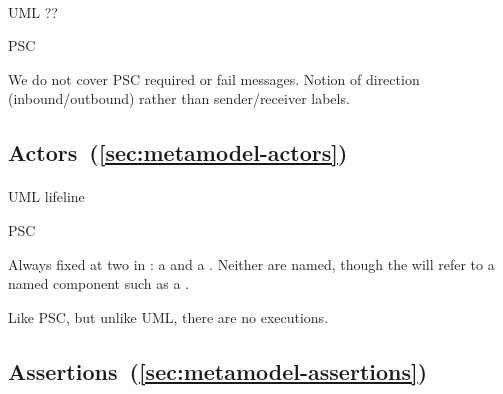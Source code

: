 \paragraph{\mmessagespec}
\begin{featset}
\item[UML] ??
\item[PSC] 
\end{featset}

We do not cover PSC required or fail messages.
Notion of direction (inbound/outbound) rather than sender/receiver labels.

\subsection{Actors~(\ref{sec:metamodel-actors})}

\paragraph{\mactor}
\begin{featset}
\item[UML] lifeline
\item[PSC] 
\end{featset}

Always fixed at two in \langname: a \mtarget{} and a \mworld{}.
Neither are named, though the \mtarget{} will refer to a
named component such as a \mrcmodule.

Like PSC, but unlike UML, there are no executions.

\subsection{Assertions~(\ref{sec:metamodel-assertions})}

